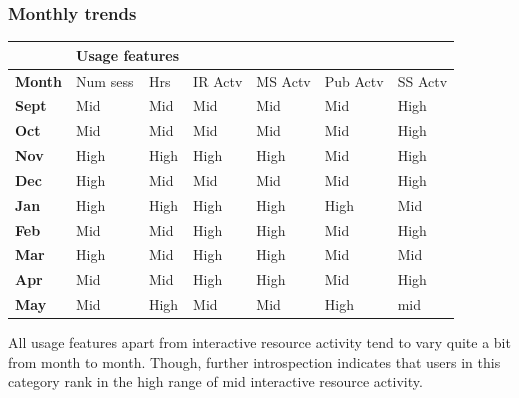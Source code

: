 \documentclass{acm_proc_article-sp}
\begin{document}
\subsubsection{Monthly trends}
\begin{table}
\label{cluster2bimonthly}
\begin{tabular}{|p{1.5cm}|p{0.6cm}|p{0.6cm}|p{0.6cm}|p{0.6cm}|p{0.8cm}|p{0.8cm}|}
& \multicolumn{2}{r}{\textbf{Usage features}}  \\ \hline
 \textbf{Month} 
 & Num sess & Hrs & IR Actv & MS Actv & Pub Actv & SS Actv \\ \hline
\textbf{Sept} & Mid                                    & Mid   & Mid         & Mid             & Mid            & High              \\  \hline 
\textbf{Oct}   & Mid                                    & Mid   & Mid         & Mid             & Mid            & High               \\  \hline 
\textbf{Nov}  & High                                   & High  & High        & High            & Mid            & High              \\  \hline 
\textbf{Dec}  & High                                   & Mid   & Mid         & Mid             & Mid            & High            \\  \hline 
\textbf{Jan}   & High                                   & High  & High        & High            & High           & Mid                 \\  \hline 
\textbf{Feb}  & Mid                                    & Mid   & High        & High            & Mid            & High                 \\  \hline 
\textbf{Mar}     & High                                   & Mid   & High        & High            & Mid            & Mid                 \\  \hline 
\textbf{Apr}     & Mid                                    & Mid   & High        & High            & Mid            & High                \\  \hline 
\textbf{May}       & Mid                                    & High  & Mid         & Mid             & High           & mid           \\  \hline       
\end{tabular}
\end{table}
All usage features apart from interactive resource activity tend to vary quite a bit from month to month. Though, further introspection indicates that users in this category rank in the high range of mid interactive resource activity.
\end{document}

